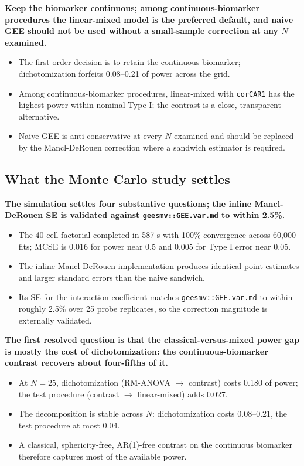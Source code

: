 \documentclass[
  11pt,
]{article}
\begin{document}
\textbf{Keep the biomarker continuous; among continuous-biomarker procedures the linear-mixed model is the preferred default, and naive GEE should not be used without a small-sample correction at any $N$ examined.}

\begin{itemize}\setlength{\itemsep}{2pt}\setlength{\parskip}{0pt}
\item The first-order decision is to retain the continuous biomarker; dichotomization forfeits 0.08--0.21 of power across the grid.
\item Among continuous-biomarker procedures, linear-mixed with \texttt{corCAR1} has the highest power within nominal Type I; the contrast is a close, transparent alternative.
\item Naive GEE is anti-conservative at every $N$ examined and should be replaced by the Mancl-DeRouen correction where a sandwich estimator is required.
\end{itemize}

\subsection{What the Monte Carlo study settles}\label{what-the-monte-carlo-study-settles}

\textbf{The simulation settles four substantive questions; the inline Mancl-DeRouen SE is validated against \texttt{geesmv::GEE.var.md} to within 2.5\%.}

\begin{itemize}\setlength{\itemsep}{2pt}\setlength{\parskip}{0pt}
\item The 40-cell factorial completed in 587 s with 100\% convergence across 60{,}000 fits; MCSE is 0.016 for power near 0.5 and 0.005 for Type I error near 0.05.
\item The inline Mancl-DeRouen implementation produces identical point estimates and larger standard errors than the naive sandwich.
\item Its SE for the interaction coefficient matches \texttt{geesmv::GEE.var.md} to within roughly 2.5\% over 25 probe replicates, so the correction magnitude is externally validated.
\end{itemize}

\textbf{The first resolved question is that the classical-versus-mixed power gap is mostly the cost of dichotomization: the continuous-biomarker contrast recovers about four-fifths of it.}

\begin{itemize}\setlength{\itemsep}{2pt}\setlength{\parskip}{0pt}
\item At $N = 25$, dichotomization (RM-ANOVA $\to$ contrast) costs 0.180 of power; the test procedure (contrast $\to$ linear-mixed) adds 0.027.
\item The decomposition is stable across $N$: dichotomization costs 0.08--0.21, the test procedure at most 0.04.
\item A classical, sphericity-free, AR(1)-free contrast on the continuous biomarker therefore captures most of the available power.
\end{itemize}
\end{document}
